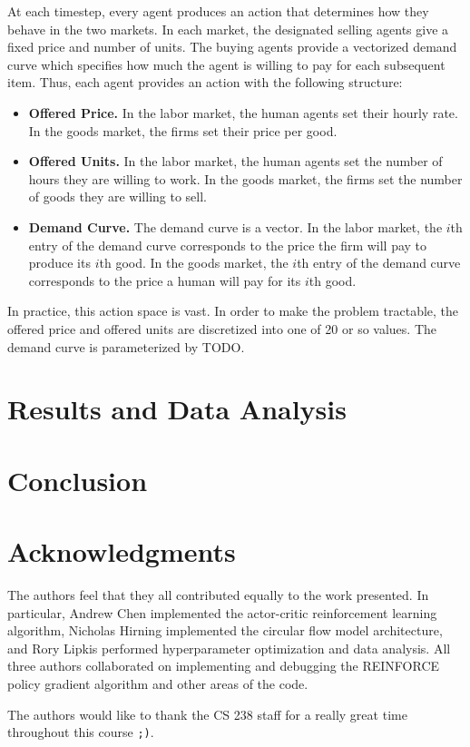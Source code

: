 \documentclass[twoside,twocolumn]{article}
\begin{document}
At each timestep, every agent produces an action that determines how they behave in the two markets. In each market, the designated selling agents give a fixed price and number of units. The buying agents provide a vectorized demand curve which specifies how much the agent is willing to pay for each subsequent item. Thus, each agent provides an action with the following structure:
\begin{itemize}
  \item \textbf{Offered Price.} In the labor market, the human agents set their hourly rate. In the goods market, the firms set their price per good.
  \item \textbf{Offered Units.} In the labor market, the human agents set the number of hours they are willing to work. In the goods market, the firms set the number of goods they are willing to sell.
  \item \textbf{Demand Curve.} The demand curve is a vector. In the labor market, the $i$th entry of the demand curve corresponds to the price the firm will pay to produce its $i$th good. In the goods market, the $i$th entry of the demand curve corresponds to the price a human will pay for its $i$th good.
\end{itemize}

In practice, this action space is vast. In order to make the problem tractable, the offered price and offered units are discretized into one of 20 or so values. The demand curve is parameterized by TODO.


\section{Results and Data Analysis}

\section{Conclusion}

\section{Acknowledgments}

The authors feel that they all contributed equally to the work presented. In particular, Andrew Chen implemented the actor-critic reinforcement learning algorithm, Nicholas Hirning implemented the circular flow model architecture, and Rory Lipkis performed hyperparameter optimization and data analysis. All three authors collaborated on implementing and debugging the REINFORCE policy gradient algorithm and other areas of the code. 

\medskip

The authors would like to thank the CS 238 staff for a really great time throughout this course \texttt{;)}.





\end{document}
